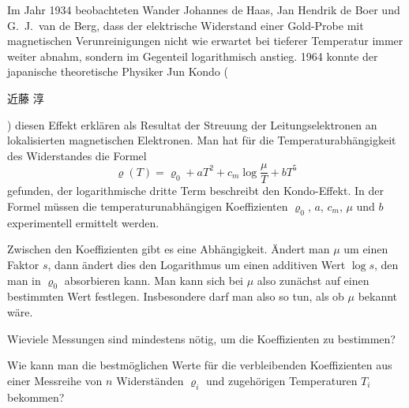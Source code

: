 Im Jahr 1934 beobachteten Wander Johannes de Haas, Jan Hendrik de Boer
und G.~J.~van de Berg, dass der elektrische Widerstand einer 
Gold-Probe mit magnetischen Verunreinigungen nicht wie erwartet bei
tieferer Temperatur immer weiter abnahm, sondern im Gegenteil
logarithmisch anstieg.
1964 konnte der japanische theoretische Physiker Jun Kondo
(\begin{CJK}{UTF8}{min}
近藤\; 淳
\end{CJK})
diesen Effekt erklären als Resultat der Streuung der Leitungselektronen
an lokalisierten magnetischen Elektronen.
Man hat für die Temperaturabhängigkeit des Widerstandes die Formel
\[
\varrho(T)
=
\varrho_0 + aT^2 + c_m\log \frac{\mu}{T} + bT^5
\]
gefunden, der logarithmische dritte Term beschreibt den Kondo-Effekt.
In der Formel müssen die temperaturunabhängigen Koeffizienten
$\varrho_0$, $a$, $c_m$, $\mu$ und $b$ experimentell ermittelt werden.

Zwischen den Koeffizienten gibt es eine Abhängigkeit.
Ändert man $\mu$ um einen Faktor $s$, dann ändert dies den Logarithmus
um einen additiven Wert $\log s$, den man in $\varrho_0$ absorbieren kann.
Man kann sich bei $\mu$ also zunächst auf einen bestimmten Wert festlegen.
Insbesondere darf man also so tun, als ob $\mu$ bekannt wäre.

\begin{teilaufgaben}
\item
Wieviele Messungen sind mindestens nötig, um die Koeffizienten zu bestimmen?
\item
Wie kann man die bestmöglichen Werte für die verbleibenden Koeffizienten
aus einer Messreihe von $n$ Widerständen $\varrho_i$ und zugehörigen
Temperaturen $T_i$ bekommen?
\end{teilaufgaben}



